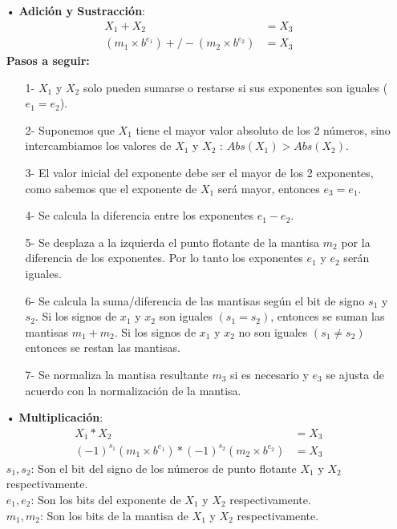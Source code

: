 \documentclass[a4paper,10pt,twocolumn]{article}
\begin{document}
	\begin{itemize}
		\item[•] \textbf{Adición y Sustracción}:  
		\begin{align}
			X_1 + X_2 &= X_3 \\
			(m_1 \times b^{e_1}) +/- (m_2 \times b^{e_2})  &= X_3 
		\end{align}
		\textbf{Pasos a seguir:}\\
		\begin{itemize}
			\item[1-] $X_1$ y $X_2$ solo pueden sumarse o restarse si sus exponentes son iguales ($e_1 = e_2$). \\
			\item[2-] Suponemos que $X_1$ tiene el mayor valor absoluto de los 2 números, sino intercambiamos los valores de $X_1$ y $X_2$ : $Abs(X_1)> Abs(X_2)$.\\
			\item[3-] El valor inicial del exponente debe ser el mayor de los 2 exponentes, como sabemos que el exponente de $X_1$ será mayor, entonces $e_3 = e_1$.\\
			\item[4-] Se calcula la diferencia entre los exponentes $e_1 - e_2$.\\
			\item[5-] Se desplaza a la izquierda el punto flotante de la mantisa $m_2$ por la diferencia de los exponentes. Por lo tanto los exponentes $e_1$ y $e_2$ serán iguales.\\
			\item[6-] Se calcula la suma/diferencia de las mantisas según el bit de signo $s_1$ y $s_2$. Si los signos de $x_1$ y $x_2$ son iguales $(s_1 = s_2)$, entonces se suman las mantisas $m_1 + m_2$. Si los signos de $x_1$ y $x_2$ no son iguales $(s_1 \neq s_2)$ entonces se restan las mantisas.\\ 
			\item[7-] Se normaliza la mantisa resultante $m_3$ si es necesario y $e_3$ se ajusta de acuerdo con la normalización de la mantisa.
		\end{itemize}
		
		
		\item[•] \textbf{Multiplicación}:   
		\begin{align}
			X_1 * X_2 &= X_3\\
			(-1)^{s_1} ( m_1 \times b^{e_1}) * (-1)^{s_2} ( m_2 \times b^{e_2}) &= X_3
		\end{align}   
		$s_1 , s_2$: Son el bit del signo de los números de punto flotante $X_1$ y $X_2$ respectivamente. \\
		$e_1 , e_2$: Son los bits del exponente de  $X_1$ y $X_2$ respectivamente.\\
		$m_1 , m_2$: Son los bits de la mantisa de  $X_1$ y $X_2$ respectivamente.\\
		

\end{itemize}
\end{document}
